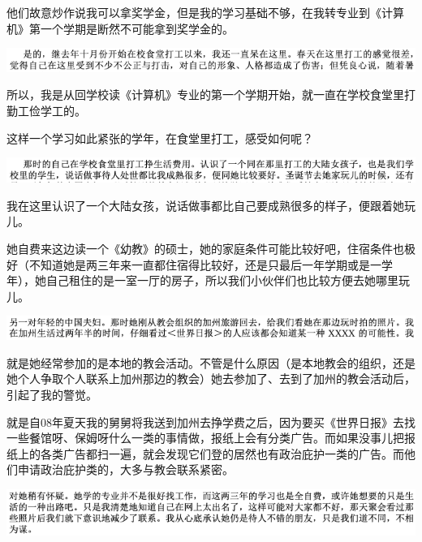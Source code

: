 \documentclass[9pt, b5paper]{article}
\begin{document}
他们故意炒作说我可以拿奖学金，但是我的学习基础不够，在我转专业到《计算机》第一个学期是断然不可能拿到奖学金的。

\begin{center}
\includegraphics[width=.9\linewidth]{./pic/backups_plans_20210424_220650.png}
\end{center}

所以，我是从回学校读《计算机》专业的第一个学期开始，就一直在学校食堂里打勤工俭学工的。 

这样一个学习如此紧张的学年，在食堂里打工，感受如何呢？

\begin{center}
\includegraphics[width=.9\linewidth]{./pic/backups_plans_20210502_153908.png}
\end{center}

我在这里认识了一个大陆女孩，说话做事都比自己要成熟很多的样子，便跟着她玩儿。 

她自费来这边读一个《幼教》的硕士，她的家庭条件可能比较好吧，住宿条件也极好（不知道她是两三年来一直都住宿得比较好，还是只最后一年学期或是一学年），她自己租住的是一室一厅的房子，所以我们小伙伴们也比较方便去她哪里玩儿。 

\begin{center}
\includegraphics[width=.9\linewidth]{./pic/backups_plans_20210502_153959.png}
\end{center}

就是她经常参加的是本地的教会活动。不管是什么原因（是本地教会的组织，还是她个人争取个人联系上加州那边的教会）她去参加了、去到了加州的教会活动后，引起了我的警觉。

就是自08年夏天我的舅舅将我送到加州去挣学费之后，因为要买《世界日报》去找一些餐馆呀、保姆呀什么一类的事情做，报纸上会有分类广告。而如果没事儿把报纸上的各类广告都扫一遍，就会发现它们登的居然也有政治庇护一类的广告。而他们申请政治庇护类的，大多与教会联系紧密。 

\begin{center}
\includegraphics[width=.9\linewidth]{./pic/backups_plans_20210502_154458.png}
\end{center}
\end{document}
